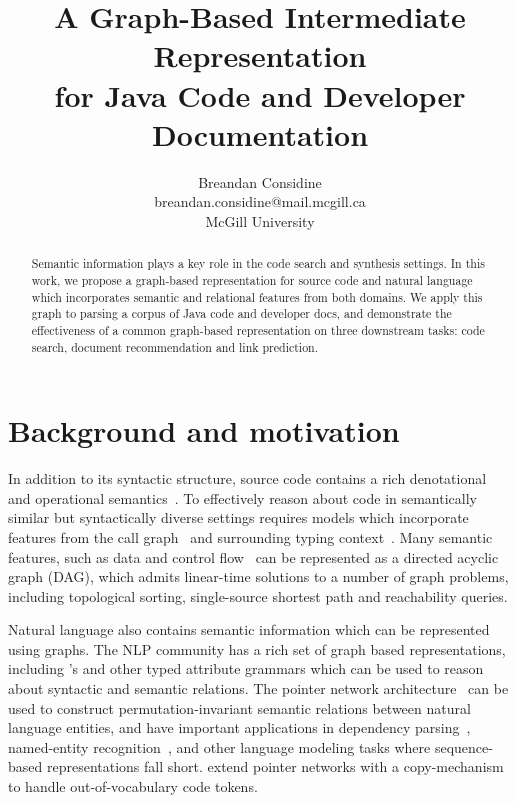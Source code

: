 \documentclass{article}
\title{A Graph-Based Intermediate Representation\\for Java Code and Developer Documentation}
\author{Breandan Considine\\
breandan.considine@mail.mcgill.ca\\
McGill University}
\begin{document}
\maketitle

\begin{abstract}
Semantic information plays a key role in the code search and synthesis settings. In this work, we propose a graph-based representation for source code and natural language which incorporates semantic and relational features from both domains. We apply this graph to parsing a corpus of Java code and developer docs, and demonstrate the effectiveness of a common graph-based representation on three downstream tasks: code search, document recommendation and link prediction.
\end{abstract}

\section{Background and motivation}

In addition to its syntactic structure, source code contains a rich denotational and operational semantics~\citep{henkel2018code}. To effectively reason about code in semantically similar but syntactically diverse settings requires models which incorporate features from the call graph~\citep{gu2016deep, liu2019neural} and surrounding typing context~\citep{allamanis2017learning}. Many semantic features, such as data and control flow~\citep{si2018learning} can be represented as a directed acyclic graph (DAG), which admits linear-time solutions to a number of graph problems, including topological sorting, single-source shortest path and reachability queries.

Natural language also contains semantic information which can be represented using graphs. The NLP community has a rich set of graph based representations, including \citet{reddy2016transforming}'s and other typed attribute grammars which can be used to reason about syntactic and semantic relations. The pointer network architecture~\citep{vinyals2015pointer, vinyals2015order} can be used to construct permutation-invariant semantic relations between natural language entities, and have important applications in dependency parsing~\citep{ma2018stack}, named-entity recognition~\citep{lample2016neural}, and other language modeling tasks where sequence-based representations fall short. \citet{li2017code} extend pointer networks with a copy-mechanism to handle out-of-vocabulary code tokens.
\end{document}
